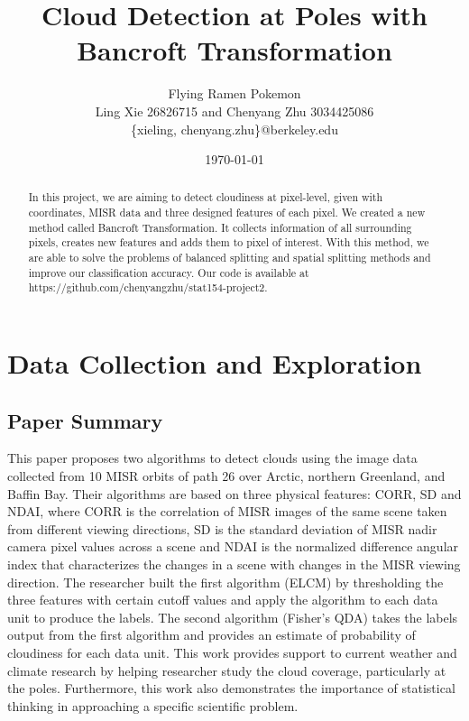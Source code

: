 \documentclass[letterpaper,11pt]{article}
\begin{document}
\title{Cloud Detection at Poles with Bancroft Transformation}
\vspace{3pt}
\author{Flying Ramen Pokemon \\
\vspace{2pt}
Ling Xie 26826715 and Chenyang Zhu 3034425086\\ 
\{xieling, chenyang.zhu\}@berkeley.edu}
\date{\today}
\maketitle

\begin{abstract}
    In this project, we are aiming to detect cloudiness at pixel-level, given with coordinates, MISR data and three designed features of each pixel. We created a new method called Bancroft Transformation. It collects information of all surrounding pixels, creates new features and adds them to pixel of interest. With this method, we are able to solve the problems of balanced splitting and spatial splitting methods and improve our classification accuracy. Our code is available at https://github.com/chenyangzhu/stat154-project2. 
\end{abstract}

\section{Data Collection and Exploration}
\subsection{Paper Summary}
This paper proposes two algorithms to detect clouds using the image data collected from 10 MISR orbits of path 26 over Arctic, northern Greenland, and Baffin Bay. Their algorithms are based on three physical features: CORR, SD and NDAI, where CORR is the correlation of MISR images of the same scene taken from different viewing directions, SD is the standard deviation of MISR nadir camera pixel values across a scene and NDAI is the normalized difference angular index that characterizes the changes in a scene with changes in the MISR viewing direction. The researcher built the first algorithm (ELCM) by thresholding the three features with certain cutoff values and apply the algorithm to each data unit to produce the labels. The second algorithm (Fisher’s QDA) takes the labels output from the first algorithm and provides an estimate of probability of cloudiness for each data unit. This work provides support to current weather and climate research by helping researcher study the cloud coverage, particularly at the poles. Furthermore, this work also demonstrates the importance of statistical thinking in approaching a specific scientific problem.
\end{document}
